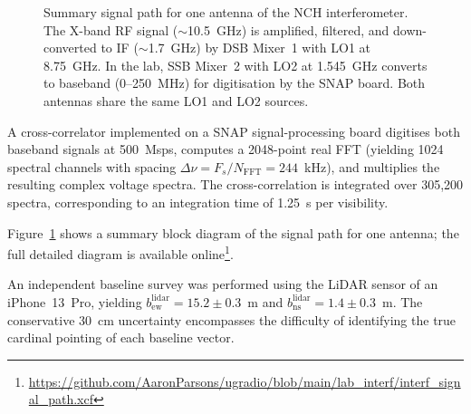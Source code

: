 \documentclass[10pt,preprint2]{aastex}
\begin{document}
\begin{figure}[b!]
\caption{Summary signal path for one antenna of the NCH interferometer. The X-band RF signal ($\sim$10.5~GHz) is amplified, filtered, and down-converted to IF ($\sim$1.7~GHz) by DSB Mixer~1 with LO1 at 8.75~GHz. In the lab, SSB Mixer~2 with LO2 at 1.545~GHz converts to baseband (0--250~MHz) for digitisation by the SNAP board. Both antennas share the same LO1 and LO2 sources.}
\label{fig:signal_path}
\end{figure}

A cross-correlator implemented on a SNAP signal-processing board \citep{SNAP2024} digitises both baseband signals at 500~Msps, computes a 2048-point real FFT (yielding 1024 spectral channels with spacing $\Delta\nu = F_s/N_{\mathrm{FFT}} = 244$~kHz), and multiplies the resulting complex voltage spectra. The cross-correlation is integrated over 305,200 spectra, corresponding to an integration time of 1.25~s per visibility.

Figure~\ref{fig:signal_path} shows a summary block diagram of the signal path for one antenna; the full detailed diagram is available online\footnote{\url{https://github.com/AaronParsons/ugradio/blob/main/lab_interf/interf_signal_path.xcf}}.

An independent baseline survey was performed using the LiDAR sensor of an iPhone~13~Pro, yielding $b_{\mathrm{ew}}^{\mathrm{lidar}} = 15.2 \pm 0.3$~m and $b_{\mathrm{ns}}^{\mathrm{lidar}} = 1.4 \pm 0.3$~m. The conservative 30~cm uncertainty encompasses the difficulty of identifying the true cardinal pointing of each baseline vector.
\end{document}
